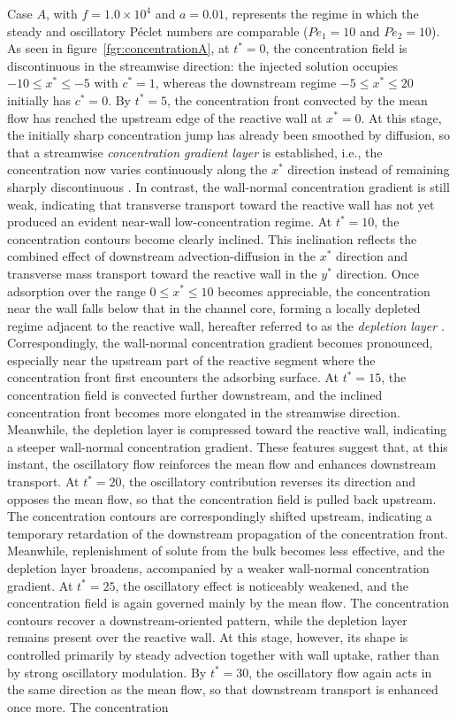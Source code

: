 \documentclass[lineno]{JFM-FLM_Au}
\begin{document}
{Case $A$, with $f = 1.0 \times 10^4$ and $a = 0.01$, represents the regime in which the steady and oscillatory Péclet numbers are comparable ($Pe_1 = 10$ and $Pe_2 = 10$). As seen in figure~\ref{fgr:concentrationA}, at $t^* = 0$, the concentration field is discontinuous in the streamwise direction: the injected solution occupies $-10 \leq x^* \leq -5$ with $c^* = 1$, whereas the downstream regime $-5 \leq x^* \leq 20$ initially has $c^* = 0$. By $t^* = 5$, the concentration front convected by the mean flow has reached the upstream edge of the reactive wall at $x^* = 0$. At this stage, the initially sharp concentration jump has already been smoothed by diffusion, so that a streamwise {\it concentration gradient layer} is established, i.e., the concentration now varies continuously along the $x^*$ direction instead of remaining sharply discontinuous \citep{Jiang_Zeng_Fu_Wu_2022, squires2008making}. In contrast, the wall-normal concentration gradient is still weak, indicating that transverse transport toward the reactive wall has not yet produced an evident near-wall low-concentration regime. At $t^* = 10$, the concentration contours become clearly inclined. This inclination reflects the combined effect of downstream advection-diffusion in the $x^*$ direction and transverse mass transport toward the reactive wall in the $y^*$ direction. Once adsorption over the range $0 \leq x^* \leq 10$ becomes appreciable, the concentration near the wall falls below that in the channel core, forming a locally depleted regime adjacent to the reactive wall, hereafter referred to as the {\it depletion layer} \citep{aquino2024equilibrium, wang2016solute}. Correspondingly, the wall-normal concentration gradient becomes pronounced, especially near the upstream part of the reactive segment where the concentration front first encounters the adsorbing surface. At $t^* = 15$, the concentration field is convected further downstream, and the inclined concentration front becomes more elongated in the streamwise direction. Meanwhile, the depletion layer is compressed toward the reactive wall, indicating a steeper wall-normal concentration gradient. These features suggest that, at this instant, the oscillatory flow reinforces the mean flow and enhances downstream transport. At $t^* = 20$, the oscillatory contribution reverses its direction and opposes the mean flow, so that the concentration field is pulled back upstream. The concentration contours are correspondingly shifted upstream, indicating a temporary retardation of the downstream propagation of the concentration front. Meanwhile, replenishment of solute from the bulk becomes less effective, and the depletion layer broadens, accompanied by a weaker wall-normal concentration gradient. At $t^* = 25$, the oscillatory effect is noticeably weakened, and the concentration field is again governed mainly by the mean flow. The concentration contours recover a downstream-oriented pattern, while the depletion layer remains present over the reactive wall. At this stage, however, its shape is controlled primarily by steady advection together with wall uptake, rather than by strong oscillatory modulation. By $t^* = 30$, the oscillatory flow again acts in the same direction as the mean flow, so that downstream transport is enhanced once more. The concentration }
\end{document}

